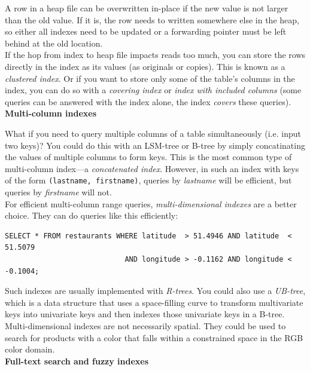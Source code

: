 \documentclass[12pt, titlepage]{article}
\newcommand{\subsubsubsection}[1]{\small \textbf{#1} \medskip}
\begin{document}
A row in a heap file can be overwritten in-place if the new value is not larger than the old value. If it is, the row needs to written somewhere else in the heap, so either all indexes need to be updated or a forwarding pointer must be left behind at the old location. \\

If the hop from index to heap file impacts reads too much, you can store the rows directly in the index as its values (as originals or copies). This is known as a \textit{clustered index}. Or if you want to store only some of the table's columns in the index, you can do so with a \textit{covering index} or \textit{index with included columns} (some queries can be answered with the index alone, the index \textit{covers} these queries). \\

\subsubsubsection{Multi-column indexes}

What if you need to query multiple columns of a table simultaneously (i.e. input two keys)? You could do this with an LSM-tree or B-tree by simply concatinating the values of multiple columns to form keys. This is the most common type of multi-column index---a \textit{concatenated index}. However, in such an index with keys of the form \texttt{(lastname, firstname)}, queries by \textit{lastname} will be efficient, but queries by \textit{firstname} will not. \\

For efficient multi-column range queries, \textit{multi-dimensional indexes} are a better choice. They can do queries like this efficiently:

\begin{verbatim}
SELECT * FROM restaurants WHERE latitude  > 51.4946 AND latitude  < 51.5079
                            AND longitude > -0.1162 AND longitude < -0.1004;
\end{verbatim}

Such indexes are usually implemented with \textit{R-trees}. You could also use a \textit{UB-tree}, which is a data structure that uses a space-filling curve to transform multivariate keys into univariate keys and then indexes those univariate keys in a B-tree. Multi-dimensional indexes are not necessarily spatial. They could be used to search for products with a color that falls within a constrained space in the RGB color domain. \\

\subsubsubsection{Full-text search and fuzzy indexes}
\end{document}
